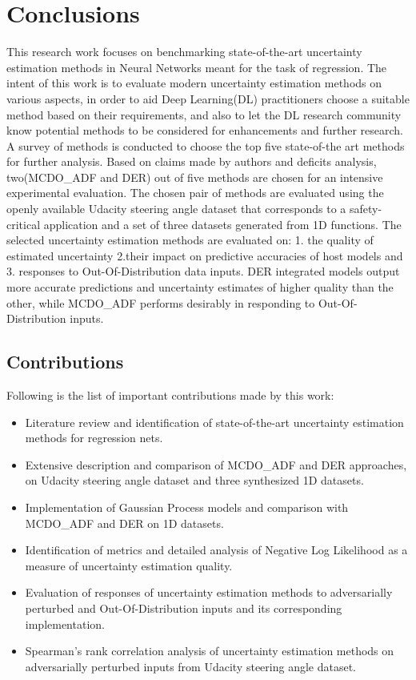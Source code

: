 

    \chapter{Conclusions}
	This research work focuses on benchmarking state-of-the-art uncertainty estimation methods in Neural Networks meant for the task of regression. The intent of this work is to evaluate modern uncertainty estimation methods on various aspects, in order to aid Deep Learning(DL) practitioners choose a suitable method based on their requirements, and also to let the DL research community know potential methods to be considered for enhancements and further research. A survey of methods is conducted to choose the top five state-of-the art methods for further analysis. Based on claims made by authors and deficits analysis, two(MCDO\_ADF and DER) out of five methods are chosen for an intensive experimental evaluation. The chosen pair of methods are evaluated using the openly available Udacity steering angle dataset that corresponds to a safety-critical application and a set of three datasets generated from 1D functions. The selected uncertainty estimation methods are evaluated on: 1. the quality of estimated uncertainty 2.their impact on predictive accuracies of host models and 3. responses to Out-Of-Distribution data inputs. DER integrated models output more accurate predictions and uncertainty estimates of higher quality than the other, while MCDO\_ADF performs desirably in responding to Out-Of-Distribution inputs.
	
    \section{Contributions}
	Following is the list of important contributions made by this work:
	\begin{itemize}
		\item Literature review and identification of state-of-the-art uncertainty estimation methods for regression nets.
		\item Extensive description and comparison of MCDO\_ADF and DER approaches, on Udacity steering angle dataset and three synthesized 1D datasets.
		\item Implementation of Gaussian Process models and comparison with MCDO\_ADF and DER on 1D datasets.
		\item Identification of metrics and detailed analysis of Negative Log Likelihood as a measure of uncertainty estimation quality.
		\item Evaluation of responses of uncertainty estimation methods to adversarially perturbed and Out-Of-Distribution inputs and its corresponding implementation.
		\item Spearman's rank correlation analysis of uncertainty estimation methods on adversarially perturbed inputs from Udacity steering angle dataset.
	\end{itemize}
